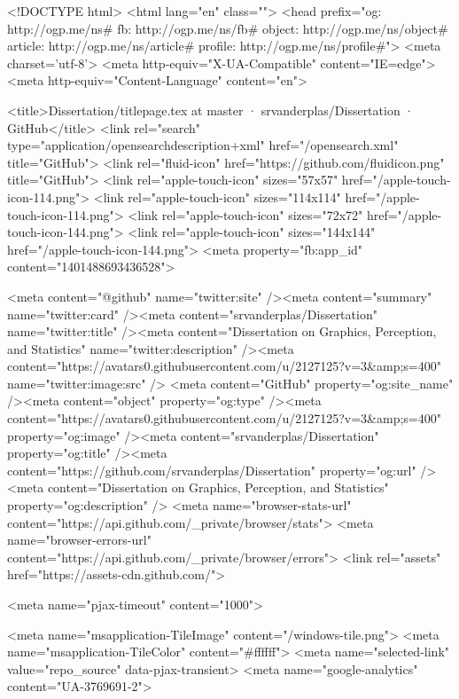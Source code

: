 


<!DOCTYPE html>
<html lang="en" class="">
  <head prefix="og: http://ogp.me/ns# fb: http://ogp.me/ns/fb# object: http://ogp.me/ns/object# article: http://ogp.me/ns/article# profile: http://ogp.me/ns/profile#">
    <meta charset='utf-8'>
    <meta http-equiv="X-UA-Compatible" content="IE=edge">
    <meta http-equiv="Content-Language" content="en">
    
    
    <title>Dissertation/titlepage.tex at master · srvanderplas/Dissertation · GitHub</title>
    <link rel="search" type="application/opensearchdescription+xml" href="/opensearch.xml" title="GitHub">
    <link rel="fluid-icon" href="https://github.com/fluidicon.png" title="GitHub">
    <link rel="apple-touch-icon" sizes="57x57" href="/apple-touch-icon-114.png">
    <link rel="apple-touch-icon" sizes="114x114" href="/apple-touch-icon-114.png">
    <link rel="apple-touch-icon" sizes="72x72" href="/apple-touch-icon-144.png">
    <link rel="apple-touch-icon" sizes="144x144" href="/apple-touch-icon-144.png">
    <meta property="fb:app_id" content="1401488693436528">

      <meta content="@github" name="twitter:site" /><meta content="summary" name="twitter:card" /><meta content="srvanderplas/Dissertation" name="twitter:title" /><meta content="Dissertation on Graphics, Perception, and Statistics" name="twitter:description" /><meta content="https://avatars0.githubusercontent.com/u/2127125?v=3&amp;s=400" name="twitter:image:src" />
      <meta content="GitHub" property="og:site_name" /><meta content="object" property="og:type" /><meta content="https://avatars0.githubusercontent.com/u/2127125?v=3&amp;s=400" property="og:image" /><meta content="srvanderplas/Dissertation" property="og:title" /><meta content="https://github.com/srvanderplas/Dissertation" property="og:url" /><meta content="Dissertation on Graphics, Perception, and Statistics" property="og:description" />
      <meta name="browser-stats-url" content="https://api.github.com/_private/browser/stats">
    <meta name="browser-errors-url" content="https://api.github.com/_private/browser/errors">
    <link rel="assets" href="https://assets-cdn.github.com/">
    
    <meta name="pjax-timeout" content="1000">
    

    <meta name="msapplication-TileImage" content="/windows-tile.png">
    <meta name="msapplication-TileColor" content="#ffffff">
    <meta name="selected-link" value="repo_source" data-pjax-transient>
      <meta name="google-analytics" content="UA-3769691-2">

